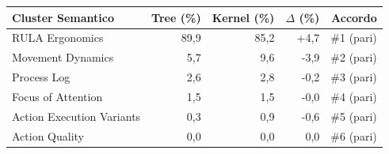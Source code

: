 \begin{tabular*}{\linewidth}{@{}l@{\extracolsep{\fill}}rrrr@{}}
\toprule
\textbf{Cluster Semantico} & \textbf{Tree (\%)} & \textbf{Kernel (\%)} & \textbf{$\Delta$ (\%)} & \textbf{Accordo} \\
\midrule
RULA Ergonomics & 89{,}9 & 85{,}2 & +4{,}7 & \#1 (pari) \\
Movement Dynamics & 5{,}7 & 9{,}6 & -3{,}9 & \#2 (pari) \\
Process Log & 2{,}6 & 2{,}8 & -0{,}2 & \#3 (pari) \\
Focus of Attention & 1{,}5 & 1{,}5 & -0{,}0 & \#4 (pari) \\
Action Execution Variants & 0{,}3 & 0{,}9 & -0{,}6 & \#5 (pari) \\
Action Quality & 0{,}0 & 0{,}0 & 0{,}0 & \#6 (pari) \\
\bottomrule
\end{tabular*}
